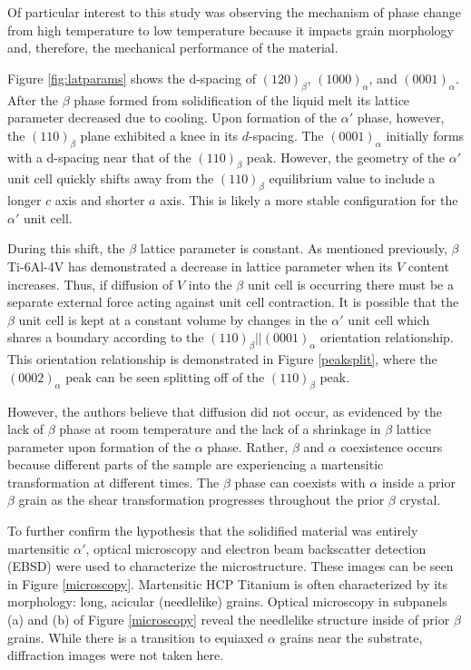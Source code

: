 Of particular interest to this study was observing the mechanism of phase change from high temperature to low temperature because it impacts grain morphology and, therefore, the mechanical performance of the material. 

Figure \ref{fig:latparams} shows the d-spacing of $\left(120\right)_\beta$, $\left(1000\right)_\alpha$, and $\left(0001\right)_\alpha$. After the $\beta$ phase formed from solidification of the liquid melt its lattice parameter decreased due to cooling. Upon formation of the $\alpha'$ phase, however, the $\left(110\right)_\beta$ plane exhibited a knee in its $d$-spacing.  The $\left(0001\right)_\alpha$ initially forms with a d-spacing near that of the $(110)_{\beta}$ peak. However, the geometry of the $\alpha'$ unit cell quickly shifts away from the $(110)_\beta$ equilibrium value to include a longer $c$ axis and shorter $a$ axis. This is likely a more stable configuration for the $\alpha'$ unit cell. 

During this shift, the $\beta$ lattice parameter is constant. As mentioned previously, $\beta$ Ti-6Al-4V has demonstrated a decrease in lattice parameter when its $V$ content increases. Thus, if diffusion of $V$ into the $\beta$ unit cell is occurring there must be a separate external force acting against unit cell contraction. It is possible that the $\beta$ unit cell is kept at a constant volume by changes in the $\alpha'$ unit cell which shares a boundary according to the $(110)_\beta||(0001)_\alpha$ orientation relationship. This orientation relationship is demonstrated in Figure \ref{peaksplit}, where the $(0002)_\alpha$ peak can be seen splitting off of the $(110)_\beta$ peak.

However, the authors believe that diffusion did not occur, as evidenced by the lack of $\beta$ phase at room temperature and the lack of a shrinkage in $\beta$ lattice parameter upon formation of the $\alpha$ phase. Rather, $\beta$ and $\alpha$ coexistence occurs because different parts of the sample are experiencing a martensitic transformation at different times. The $\beta$ phase can coexists with $\alpha$ inside a prior $\beta$ grain as the shear transformation progresses throughout the prior $\beta$ crystal.

To further confirm the hypothesis that the solidified material was entirely martensitic $\alpha'$, optical microscopy and electron beam backscatter detection (EBSD) were used to characterize the microstructure. These images can be seen in Figure \ref{microscopy}. Martensitic HCP Titanium is often characterized by its morphology: long, acicular (needlelike) grains. Optical microscopy in subpanels (a) and (b) of Figure \ref{microscopy} reveal the needlelike structure inside of prior $\beta$ grains. While there is a transition to equiaxed $\alpha$ grains near the substrate, diffraction images were not taken here.

